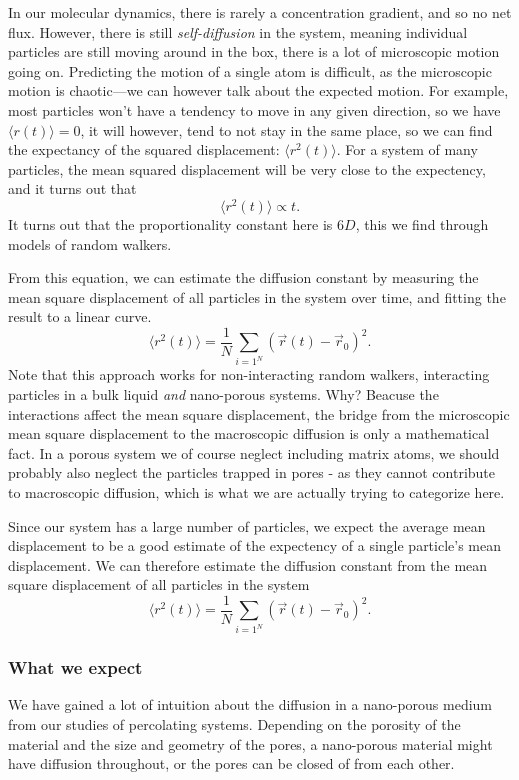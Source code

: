 \documentclass[a4paper, 11pt, notitlepage, english]{article}
\begin{document}
In our molecular dynamics, there is rarely a concentration gradient, and so no net flux. However, there is still \emph{self-diffusion} in the system, meaning individual particles are still moving around in the box, there is a lot of microscopic motion going on. Predicting the motion of a single atom is difficult, as the microscopic motion is chaotic---we can however talk about the expected motion. For example, most particles won't have a tendency to move in any given direction, so we have $\langle r(t) \rangle = 0$, it will however, tend to not stay in the same place, so we can find the expectancy of the squared displacement: $\langle r^2(t) \rangle$. For a system of many particles, the mean squared displacement will be very close to the expectency, and it turns out that
$$\langle r^2(t) \rangle \propto t.$$
It turns out that the proportionality constant here is $6D$, this we find through models of random walkers.

From this equation, we can estimate the diffusion constant by measuring the mean square displacement of all particles in the system over time, and fitting the result to a linear curve.
$$\langle r^2(t) \rangle = \frac{1}{N}\sum_{i=1^N} (\vec{r}(t) - \vec{r}_{0})^2.$$
Note that this approach works for non-interacting random walkers, interacting particles in a bulk liquid \emph{and} nano-porous systems. Why? Beacuse the interactions affect the mean square displacement, the bridge from the microscopic mean square displacement to the macroscopic diffusion is only a mathematical fact. In a porous system we of course neglect including matrix atoms, we should probably also neglect the particles trapped in pores - as they cannot contribute to macroscopic diffusion, which is what we are actually trying to categorize here.

Since our system has a large number of particles, we expect the average mean displacement to be a good estimate of the expectency of a single particle's mean displacement. We can therefore estimate the diffusion constant from the mean square displacement of all particles in the system
$$\langle r^2(t) \rangle = \frac{1}{N}\sum_{i=1^N} (\vec{r}(t) - \vec{r}_{0})^2.$$

\subsubsection*{What we expect}

We have gained a lot of intuition about the diffusion in a nano-porous medium from our studies of percolating systems. Depending on the porosity of the material and the size and geometry of the pores, a nano-porous material might have diffusion throughout, or the pores can be closed of from each other.
\end{document}
